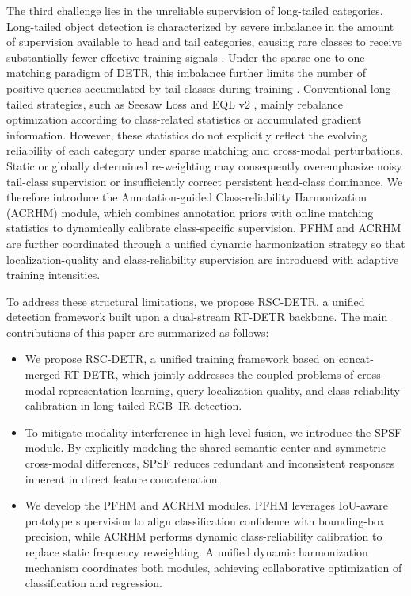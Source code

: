 \documentclass[letterpaper,journal]{IEEEtran}
\begin{document}
The third challenge lies in the unreliable supervision of long-tailed categories. Long-tailed object detection is characterized by severe imbalance in the amount of supervision available to head and tail categories, causing rare classes to receive substantially fewer effective training signals \cite{bags,seesaw,eqlv2}. Under the sparse one-to-one matching paradigm of DETR, this imbalance further limits the number of positive queries accumulated by tail classes during training \cite{detr}. Conventional long-tailed strategies, such as Seesaw Loss \cite{seesaw} and EQL v2 \cite{eqlv2}, mainly rebalance optimization according to class-related statistics or accumulated gradient information. However, these statistics do not explicitly reflect the evolving reliability of each category under sparse matching and cross-modal perturbations. Static or globally determined re-weighting may consequently overemphasize noisy tail-class supervision or insufficiently correct persistent head-class dominance. We therefore introduce the Annotation-guided Class-reliability Harmonization (ACRHM) module, which combines annotation priors with online matching statistics to dynamically calibrate class-specific supervision. PFHM and ACRHM are further coordinated through a unified dynamic harmonization strategy so that localization-quality and class-reliability supervision are introduced with adaptive training intensities.

To address these structural limitations, we propose RSC-DETR, a unified detection framework built upon a dual-stream RT-DETR backbone. The main contributions of this paper are summarized as follows:
\begin{itemize}
\item We propose RSC-DETR, a unified training framework based on concat-merged RT-DETR, which jointly addresses the coupled problems of cross-modal representation learning, query localization quality, and class-reliability calibration in long-tailed RGB--IR detection.
\item To mitigate modality interference in high-level fusion, we introduce the SPSF module. By explicitly modeling the shared semantic center and symmetric cross-modal differences, SPSF reduces redundant and inconsistent responses inherent in direct feature concatenation.
\item We develop the PFHM and ACRHM modules. PFHM leverages IoU-aware prototype supervision to align classification confidence with bounding-box precision, while ACRHM performs dynamic class-reliability calibration to replace static frequency reweighting. A unified dynamic harmonization mechanism coordinates both modules, achieving collaborative optimization of classification and regression.
\end{itemize}
\end{document}
